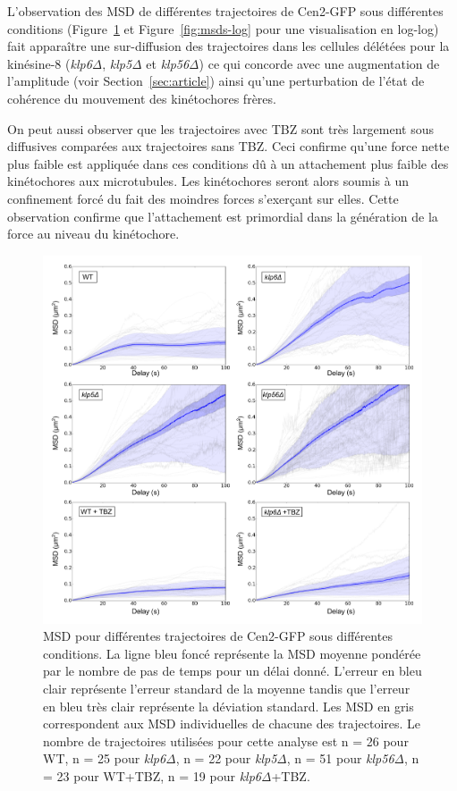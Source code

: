 \documentclass[12pt,a4paper,twoside,openright]{book}
\begin{document}
L'observation des MSD de différentes trajectoires de Cen2-GFP sous
différentes conditions (Figure~\ref{fig:msds} et
Figure~\ref{fig:msds-log} pour une visualisation en log-log) fait
apparaître une sur-diffusion des trajectoires dans les cellules délétées
pour la kinésine-8 (\emph{klp6Δ}, \emph{klp5Δ} et \emph{klp56Δ}) ce qui
concorde avec une augmentation de l'amplitude (voir
Section~\ref{sec:article}) ainsi qu'une perturbation de l'état de
cohérence du mouvement des kinétochores frères.

On peut aussi observer que les trajectoires avec TBZ sont très largement
sous diffusives comparées aux trajectoires sans TBZ. Ceci confirme
qu'une force nette plus faible est appliquée dans ces conditions dû à un
attachement plus faible des kinétochores aux microtubules. Les
kinétochores seront alors soumis à un confinement forcé du fait des
moindres forces s'exerçant sur elles. Cette observation confirme que
l'attachement est primordial dans la génération de la force au niveau du
kinétochore.

\begin{figure}[htbp]
\centering
\includegraphics{figures/results/imaging/msds.png}
\caption[MSD pour différentes trajectoires de Cen2-GFP sous différentes conditions.]{\label{fig:msds}MSD
pour différentes trajectoires de Cen2-GFP sous différentes conditions.
La ligne bleu foncé représente la MSD moyenne pondérée par le nombre de
pas de temps pour un délai donné. L'erreur en bleu clair représente
l'erreur standard de la moyenne tandis que l'erreur en bleu très clair
représente la déviation standard. Les MSD en gris correspondent aux MSD
individuelles de chacune des trajectoires. Le nombre de trajectoires
utilisées pour cette analyse est n = 26 pour WT, n = 25 pour
\emph{klp6Δ}, n = 22 pour \emph{klp5Δ}, n = 51 pour \emph{klp56Δ}, n =
23 pour WT+TBZ, n = 19 pour \emph{klp6Δ}+TBZ.}
\end{figure}
\end{document}
